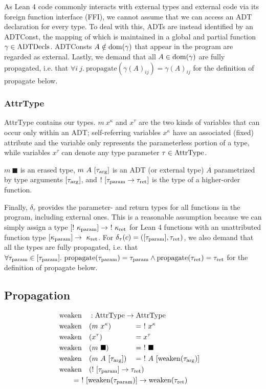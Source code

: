 As Lean 4 code commonly interacts with external types and external code via its foreign function interface (FFI), we cannot assume that we can access an ADT declaration for every type. To deal with this, ADTs are instead identified by an ADTConst, the mapping of which is maintained in a global and partial function $\gamma \in \mathrm{ADTDecls}$. ADTConsts $A \notin \mathrm{dom}(\gamma)$ that appear in the program are regarded as external. Lastly, we demand that all $A \in \mathrm{dom}(\gamma)$ are fully propagated, i.e. that $\forall i\ j.\ \mathrm{propagate}(\gamma(A)_{ij}) = \gamma(A)_{ij}$ for the definition of propagate below.

\subsubsection{AttrType}
AttrType contains our types. $m\ x^\kappa$ and $x^\tau$ are the two kinds of variables that can occur only within an ADT; self-referring variables $x^\kappa$ have an associated (fixed) attribute and the variable only represents the parameterless portion of a type, while variables $x^\tau$ can denote any type parameter $\tau \in \mathrm{AttrType}$. 

$m\ \blacksquare$ is an erased type, $m\ A\ [\tau_{\mathrm{arg}}]$ is an ADT (or external type) $A$ parametrized by type arguments $[\tau_{\mathrm{arg}}]$, and $!\ [\tau_{\mathrm{param}} \to \tau_{\mathrm{ret}}]$ is the type of a higher-order function. 

Finally, $\delta_\tau$ provides the parameter- and return types for all functions in the program, including external ones. This is a reasonable assumption because we can simply assign a type $[!\ \kappa_\param] \to \ !\ \kappa_\ret$ for Lean 4 functions with an unattributed function type $[\kappa_{\mathrm{param}}] \to \ \kappa_{\mathrm{ret}}$. For $\delta_\tau(c) = ([\tau_{\mathrm{param}}], \tau_{\mathrm{ret}})$, we also demand that all the types are fully propagated, i.e. that $\forall \tau_{\mathrm{param}} \in [\tau_{\mathrm{param}}].\ \mathrm{propagate}(\tau_{\mathrm{param}}) = \tau_{\mathrm{param}} \land \mathrm{propagate}(\tau_{\mathrm{ret}}) = \tau_{\mathrm{ret}}$ for the definition of propagate below.

\subsection{Propagation}

\newcommand{\weaken}{\mathrm{weaken}}
\newcommand{\rebreak}[1]{\mathrlap{\qquad#1}}

\begin{alignat*}{3}
  &\weaken &&: \mathrlap{\AttrType \to \AttrType} \\
  &\weaken&&(m\ x^\kappa) &&=\ !\ x^\kappa \\
  &\weaken&&(x^\tau) &&= x^\tau \\
  &\weaken&&(m\ \blacksquare) &&=\ !\ \blacksquare \\
  &\weaken&&(m\ A\ [\tau_\arrg]) &&=\ !\ A\ [\weaken(\tau_\arrg)] \\
  &\weaken&&\mathrlap{(!\ [\tau_\param] \to \tau_\ret)} \\
  &\rebreak{= \ !\ [\weaken(\tau_\param)] \to \weaken(\tau_\ret)}
\end{alignat*}

